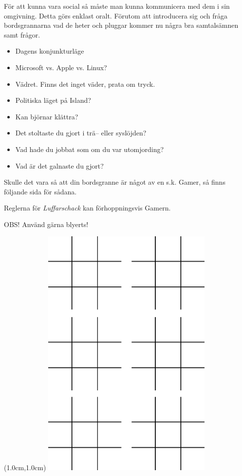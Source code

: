 {För att kunna vara social så måste man kunna kommunicera med dem i sin omgivning. 
Detta görs enklast oralt. Förutom att introducera sig och fråga bordsgrannarna vad de 
heter och pluggar kommer nu några bra samtalsämnen samt frågor.
\\
\begin{itemize}[itemsep=0.0em]
  \item Dagens konjunkturläge
  \item Microsoft vs. Apple vs. Linux?
  \item Vädret. Finns det inget väder, prata om tryck.
  \item Politiska läget på Island?
  \item Kan björnar klättra?
  \item Det stoltaste du gjort i trä– eller syslöjden?
  \item Vad hade du jobbat som om du var utomjording?
  \item Vad är det galnaste du gjort?
\end{itemize}


Skulle det vara så att din bordsgranne är något av en s.k. Gamer, så finns följande sida för sådana.

Reglerna för \textit{Luffarschack} kan förhoppningsvis Gamern.

OBS! Använd gärna blyerts!

\newpage

\thispagestyle{plainnohead}

\phantom{osynlig text}

\begin{textblock*}{3cm}(1.0cm,1.0cm) %
   \includegraphics[width=8.5cm]{./bilder/luffarschack.png}
\end{textblock*}


}
